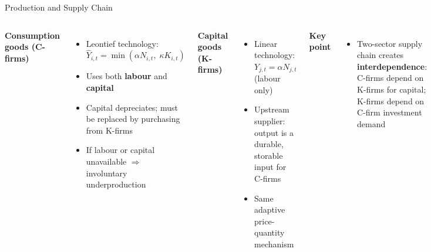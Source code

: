 \documentclass[9pt]{beamer}
\begin{document}
\begin{frame}{Production and Supply Chain}
\begin{columns}[T]
\textbf{Consumption goods (C-firms)}
\begin{itemize}
  \item Leontief technology:
  $\hat{Y}_{i,t} = \min(\alpha N_{i,t},\; \kappa K_{i,t})$
  \item Uses both \textbf{labour} and \textbf{capital}
  \item Capital depreciates; must be replaced by purchasing from K-firms
  \item If labour or capital unavailable $\Rightarrow$ involuntary underproduction
\end{itemize}

\textbf{Capital goods (K-firms)}
\begin{itemize}
  \item Linear technology: $Y_{j,t} = \alpha N_{j,t}$ (labour only)
  \item Upstream supplier: output is a durable, storable input for C-firms
  \item Same adaptive price-quantity mechanism
\end{itemize}

\vspace{0.3cm}
\textbf{Key point}
\begin{itemize}
  \item Two-sector supply chain creates \textbf{interdependence}: C-firms depend on K-firms for capital; K-firms depend on C-firm investment demand
\end{itemize}
\end{columns}
\end{frame}
\end{document}
